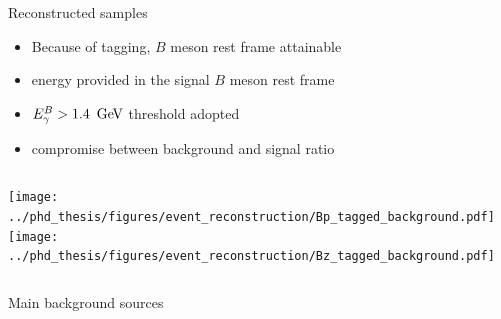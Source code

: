 \documentclass[xcolor=dvipsnames]{beamer}
\begin{document}
\begin{frame}{Reconstructed samples}
   \small
   \begin{itemize}
      \item Because of tagging, $B$ meson rest frame attainable
      \item[\ra] energy provided in the signal $B$ meson rest frame
      \item ${E^B_{\gamma}}>1.4~\mathrm{\,Ge\kern -0.1em V}$ threshold adopted
      \item[\ra] compromise between background and signal ratio
   \end{itemize}
   \begin{columns}
      \texttt{[image: ../phd\_thesis/figures/event\_reconstruction/Bp\_tagged\_background.pdf]}
      \texttt{[image: ../phd\_thesis/figures/event\_reconstruction/Bz\_tagged\_background.pdf]}
   \end{columns}
\end{frame}

\begin{frame}{Main background sources}
\end{frame}
\end{document}
